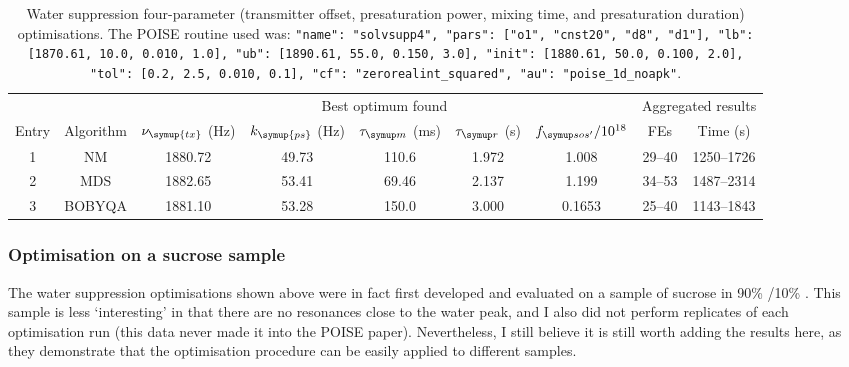 \begin{table}
    \centering
    \begin{tabular}{ccccccccc}
        \toprule
              &           & \multicolumn{5}{c}{Best optimum found} & \multicolumn{2}{c}{Aggregated results} \\
                            \cmidrule(lr){3-7}                       \cmidrule(lr){8-9}
        Entry & Algorithm & $\nu_{\symup{tx}}$ (\unit{\Hz}) & $k_{\symup{ps}}$ (\unit{\Hz}) & $\taum$ (\unit{\ms}) & $\taur$ (\unit{\s}) & $\fsosre / 10^{18}$ & FEs    & Time (\unit{\s}) \\
        \midrule
        1     & NM        & 1880.72                    & 49.73          & 110.6              & 1.972             & 1.008                    & 29--40 & 1250--1726     \\
        2     & MDS       & 1882.65                    & 53.41          & 69.46              & 2.137             & 1.199                    & 34--53 & 1487--2314     \\
        3     & BOBYQA    & 1881.10                    & 53.28          & 150.0              & 3.000             & 0.1653                   & 25--40 & 1143--1843     \\
        \bottomrule
    \end{tabular}
    \caption[Water suppression four-parameter optimisations]{
        Water suppression four-parameter (transmitter offset, presaturation power, mixing time, and presaturation duration) optimisations.
        The POISE routine used was: \texttt{{"name": "solvsupp4", "pars": ["o1", "cnst20", "d8", "d1"], "lb": [1870.61, 10.0, 0.010, 1.0], "ub": [1890.61, 55.0, 0.150, 3.0], "init": [1880.61, 50.0, 0.100, 2.0], "tol": [0.2, 2.5, 0.010, 0.1], "cf": "zerorealint_squared", "au": "poise_1d_noapk"}}.
    }
    \label{tbl:poise_solvsupp4p}
\end{table}




\subsubsection{Optimisation on a sucrose sample}

The water suppression optimisations shown above were in fact first developed and evaluated on a sample of sucrose in 90\% /10\% .
This sample is less `interesting' in that there are no resonances close to the water peak, and I also did not perform replicates of each optimisation run (this data never made it into the POISE paper).
Nevertheless, I still believe it is still worth adding the results here, as they demonstrate that the optimisation procedure can be easily applied to different samples.

